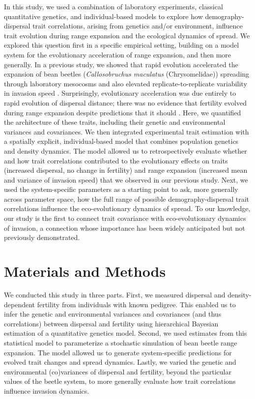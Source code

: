 \documentclass[11pt]{article}
\begin{document}
In this study, we used a combination of laboratory experiments, classical quantitative genetics, and individual-based models to explore how demography-dispersal trait correlations, arising from genetics and/or environment, influence trait evolution during range expansion and the ecological dynamics of spread.
We explored this question first in a specific empirical setting, building on a model system for the evolutionary acceleration of range expansion, and then more generally.
In a previous study, we showed that rapid evolution accelerated the expansion of bean beetles (\textit{Callosobruchus maculatus} (Chrysomelidae)) spreading through laboratory mesocosms and also elevated replicate-to-replicate variability in invasion speed \citep{ochocki_rapid_2017}.
Surprisingly, evolutionary acceleration was due entirely to rapid evolution of dispersal distance; there was no evidence that fertility evolved during range expansion despite predictions that it should \citep{ochocki_rapid_2017}.
Here, we quantified the architecture of these traits, including their genetic and environmental variances and covariances.
We then integrated experimental trait estimation with a spatially explicit, individual-based model that combines population genetics and density dynamics.
The model allowed us to retrospectively evaluate whether and how trait correlations contributed to the evolutionary effects on traits (increased dispersal, no change in fertility) and range expansion (increased mean and variance of invasion speed) that we observed in our previous study.
Next, we used the system-specific parameters as a starting point to ask, more generally across parameter space, how the full range of possible demography-dispersal trait correlations influence the eco-evolutionary dynamics of spread.
To our knowledge, our study is the first to connect trait covariance with  eco-evolutionary dynamics of invasion, a connection whose importance has been widely anticipated \citep{chuang_expanding_2016,phillips_life-history_2010,perkins_evolution_2013} but not previously demonstrated.

\section*{Materials and Methods}

We conducted this study in three parts.
First, we measured dispersal and density-dependent fertility from individuals with known pedigree.
This enabled us to infer the genetic and environmental variances and covariances (and thus correlations) between dispersal and fertility using hierarchical Bayesian estimation of a quantitative genetics model.
Second, we used estimates from this statistical model to parameterize a stochastic simulation of bean beetle range expansion.
The model allowed us to generate system-specific predictions for evolved trait changes and spread dynamics.
Lastly, we varied the genetic and environmental (co)variances of dispersal and fertility, beyond the particular values of the beetle system, to more generally evaluate how trait correlations influence invasion dynamics.
\end{document}
